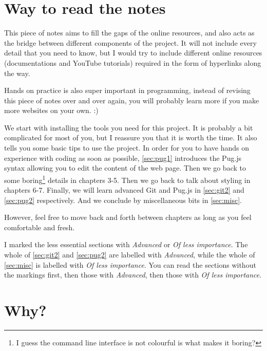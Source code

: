 \section{Way to read the notes}

This piece of notes aims to fill the gaps of the online resources, and also acts as the bridge between different components of the project. It will not include every detail that you need to know, but I would try to include different online resources (documentations and YouTube tutorials) required in the form of hyperlinks along the way.
\vspace{6mm}

Hands on practice is also super important in programming, instead of revising this piece of notes over and over again, you will probably learn more if you make more websites on your own. :)
\vspace{6mm}

We start with installing the tools you need for this project. It is probably a bit complicated for most of you, but I reassure you that it is worth the time. It also tells you some basic tips to use the project. In order for you to have hands on experience with coding as soon as possible, \cref{sec:pug1} introduces the Pug.js syntax allowing you to edit the content of the web page. Then we go back to some boring\footnote{I guess the command line interface is not colourful is what makes it boring?} details in chapters 3-5. Then we go back to talk about styling in chapters 6-7. Finally, we will learn advanced Git and Pug.js in \cref{sec:git2} and \cref{sec:pug2} respectively. And we conclude by miscellaneous bits in \cref{sec:misc}.
\vspace{6mm}

However, feel free to move back and forth between chapters as long as you feel comfortable and fresh. 
\vspace{6mm}

I marked the less essential sections with \textit{Advanced} or \textit{Of less importance}. The whole of \cref{sec:git2} and \cref{sec:pug2} are labelled with \textit{Advanced}, while the whole of \cref{sec:misc} is labelled with \textit{Of less importance}. You can read the sections without the markings first, then those with \textit{Advanced}, then those with \textit{Of less importance}.

\section{Why?}

